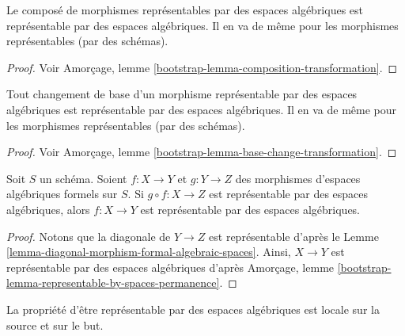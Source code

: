 \begin{lemma}
\label{lemma-composition-representable}
Le composé de morphismes représentables par des espaces algébriques est
représentable par des espaces algébriques. Il en va de même pour les morphismes représentables
(par des schémas).
\end{lemma}

\begin{proof}
Voir Amorçage, lemme \ref{bootstrap-lemma-composition-transformation}.
\end{proof}

\begin{lemma}
\label{lemma-base-change-representable}
Tout changement de base d'un morphisme représentable par des espaces algébriques est
représentable par des espaces algébriques. Il en va de même pour les morphismes représentables
(par des schémas).
\end{lemma}

\begin{proof}
Voir Amorçage, lemme \ref{bootstrap-lemma-base-change-transformation}.
\end{proof}

\begin{lemma}
\label{lemma-permanence-representable}
Soit $S$ un schéma. Soient $f : X \to Y$ et $g : Y \to Z$ des morphismes
d'espaces algébriques formels sur $S$. Si $g \circ f : X \to Z$ est représentable
par des espaces algébriques, alors $f : X \to Y$ est représentable par des espaces algébriques.
\end{lemma}

\begin{proof}
Notons que la diagonale de $Y \to Z$ est représentable d'après le
Lemme \ref{lemma-diagonal-morphism-formal-algebraic-spaces}.
Ainsi, $X \to Y$ est représentable par des espaces algébriques d'après
Amorçage, lemme \ref{bootstrap-lemma-representable-by-spaces-permanence}.
\end{proof}

\noindent
La propriété d'être représentable par des espaces algébriques est locale sur la
source et sur le but.

